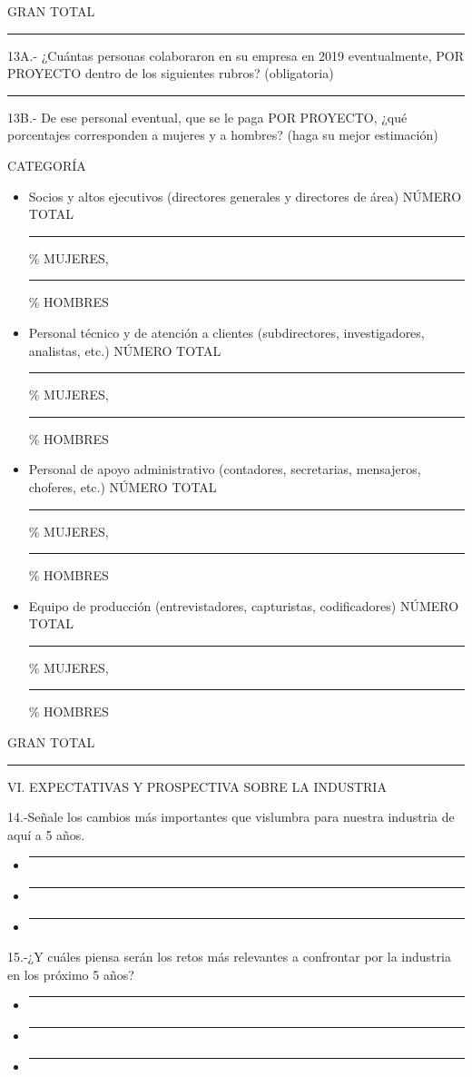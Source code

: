 GRAN TOTAL \rule{20mm}{0.1mm}


13A.- ¿Cuántas personas colaboraron en su empresa en 2019 eventualmente, POR PROYECTO dentro de los siguientes rubros? (obligatoria) \rule{20mm}{0.1mm}  \newline

13B.- De ese personal eventual, que se le paga POR PROYECTO, ¿qué porcentajes corresponden a mujeres y a hombres? (haga su mejor estimación)

CATEGORÍA

\begin{itemize}
    \item[1)] Socios y altos ejecutivos (directores generales y directores de área) NÚMERO TOTAL \rule{20mm}{0.1mm} \% MUJERES, \rule{20mm}{0.1mm} \% HOMBRES
    \item [2)] Personal técnico y de atención a clientes (subdirectores, investigadores, analistas, etc.) NÚMERO TOTAL \rule{20mm}{0.1mm} \% MUJERES, \rule{20mm}{0.1mm} \% HOMBRES
    \item [3)] Personal de apoyo administrativo (contadores, secretarias, mensajeros, choferes, etc.) NÚMERO TOTAL \rule{20mm}{0.1mm} \% MUJERES, \rule{20mm}{0.1mm} \% HOMBRES
    \item [4)] Equipo de producción (entrevistadores, capturistas, codificadores) NÚMERO TOTAL \rule{20mm}{0.1mm} \% MUJERES, \rule{20mm}{0.1mm} \% HOMBRES
\end{itemize}
 
GRAN TOTAL \rule{20mm}{0.1mm}

VI. EXPECTATIVAS Y PROSPECTIVA SOBRE LA INDUSTRIA

14.-Señale los cambios más importantes que vislumbra para nuestra industria de aquí a 5 años.

\begin{itemize}
    \item[1)] \rule{20mm}{0.1mm}
    \item [2)] \rule{20mm}{0.1mm}
    \item [3)] \rule{20mm}{0.1mm}
\end{itemize}

15.-¿Y cuáles piensa serán los retos más relevantes a confrontar por la industria en los próximo 5 años?
\begin{itemize}
    \item[1)] \rule{20mm}{0.1mm}
    \item [2)] \rule{20mm}{0.1mm}
    \item [3)] \rule{20mm}{0.1mm}
\end{itemize}

